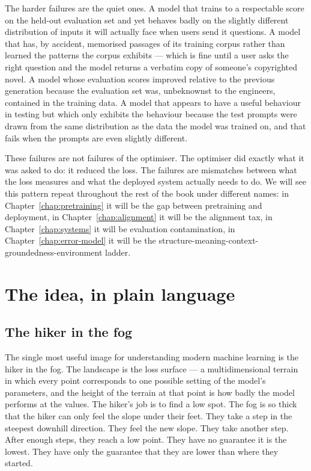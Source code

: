 The harder failures are the quiet ones. A model that trains to
a respectable score on the held-out evaluation set and yet
behaves badly on the slightly different distribution of inputs
it will actually face when users send it questions. A model
that has, by accident, memorised passages of its training
corpus rather than learned the patterns the corpus exhibits ---
which is fine until a user asks the right question and the
model returns a verbatim copy of someone's copyrighted novel.
A model whose evaluation scores improved relative to the
previous generation because the evaluation set was, unbeknownst
to the engineers, contained in the training data. A model that
appears to have a useful behaviour in testing but which only
exhibits the behaviour because the test prompts were drawn from
the same distribution as the data the model was trained on,
and that fails when the prompts are even slightly different.

These failures are not failures of the optimiser. The optimiser
did exactly what it was asked to do: it reduced the loss. The
failures are mismatches between what the loss measures and what
the deployed system actually needs to do. We will see this
pattern repeat throughout the rest of the book under different
names: in Chapter~\ref{chap:pretraining} it will be the gap between pretraining and
deployment, in Chapter~\ref{chap:alignment} it will be the alignment tax, in
Chapter~\ref{chap:systems} it will be evaluation contamination, in Chapter~\ref{chap:error-model} it
will be the structure-meaning-context-groundedness-environment
ladder.

\section{The idea, in plain language}

\subsection*{The hiker in the fog}

The single most useful image for understanding modern machine
learning is the hiker in the fog. The landscape is the loss
surface --- a multidimensional terrain in which every point
corresponds to one possible setting of the model's parameters,
and the height of the terrain at that point is how badly the
model performs at the values. The hiker's job is to find a low
spot. The fog is so thick that the hiker can only feel the
slope under their feet. They take a step in the steepest
downhill direction. They feel the new slope. They take another
step. After enough steps, they reach a low point. They have no
guarantee it is the lowest. They have only the guarantee that
they are lower than where they started.

